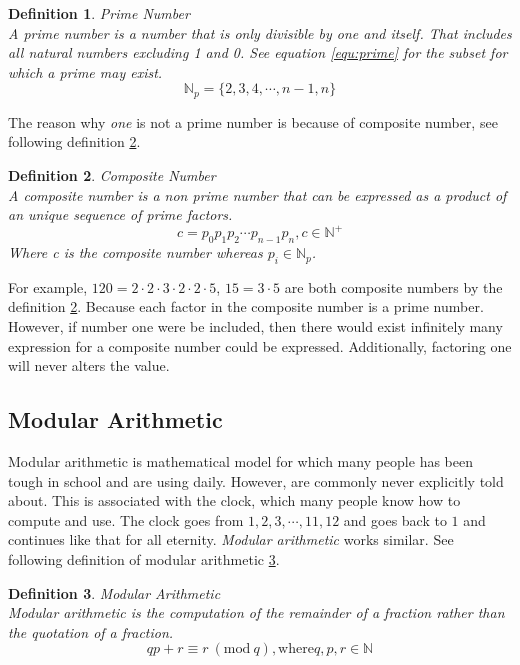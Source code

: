 \documentclass[12pt, oneside, onecolumn]{article}
\newtheorem{definition}{Definition}[section]
\newcommand{\Mod}[1]{\ (\mathrm{mod}\ #1)}
\begin{document}
\begin{definition}{Prime Number}\label{def:prime}
\\
A \emph{prime number} is a number that is only divisible by one and itself. That includes all natural numbers excluding 1 and 0. See equation \ref{equ:prime} for the subset for which a prime may exist.
\begin{equation}
\mathbb{N}_{p} = \{2,3,4,\cdots,n-1,n\}
\end{equation}\label{equ:prime}
\end{definition}

The reason why \emph{one} is not a prime number is because of composite number, see following definition \ref{def:comp}.

\begin{definition}{Composite Number}\label{def:comp}
\\
A composite number is a non prime number that can be expressed as a product of an unique sequence of prime factors.
\begin{equation}
c = p_0 p_1 p_2 \cdots p_{n-1} p_{n}, c \in \mathbb{N}^{+}
\end{equation}
Where c is the composite number whereas $p_{i} \in \mathbb{N}_{p}$.
\end{definition}

For example, $120 = 2 \cdot 2 \cdot 3 \cdot 2 \cdot 2 \cdot 5$, $15 = 3 \cdot 5$ are both composite numbers by the definition \ref{def:comp}. Because each factor in the composite number is a prime number. However, if number one were be included, then there would exist infinitely many expression for a composite number could be expressed. Additionally, factoring one will never alters the value.

%
\subsection{Modular Arithmetic}\label{sec:mod}
Modular arithmetic is mathematical model for which many people has been tough in school and are using daily. However, are commonly never explicitly told about. This is associated with the clock, which many people know how to compute and use. The clock goes from $1,2,3,\cdots,11,12$ and goes back to $1$ and continues like that for all eternity. \textit{Modular arithmetic} works similar. See following definition of modular arithmetic \ref{def:modular}.

\begin{definition}{Modular Arithmetic}\label{def:modular}
\\
Modular arithmetic is the computation of the remainder of a fraction rather than the quotation of a fraction.
\begin{equation}
qp +r \equiv r \Mod{q}, \text{where} q, p, r \in \mathbb{N}
\end{equation}
\end{definition}
\end{document}
